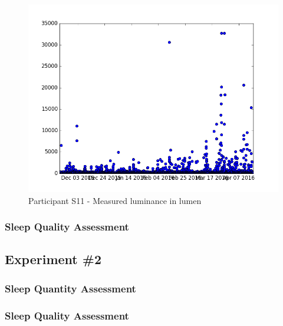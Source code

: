 \documentclass[12pt]{article} %
\begin{document}
\begin{figure}[H]
    \centering
    \includegraphics[width=\textwidth]{img/graphs/LightPresenceGraph.png}
    \caption{Participant S11 - Measured luminance in lumen}
    \label{fig:s11luminance}
\end{figure}


\subsubsection{Sleep Quality Assessment}




\newpage
\subsection{Experiment \#2}
\subsubsection{Sleep Quantity Assessment}



\subsubsection{Sleep Quality Assessment}
\end{document}
